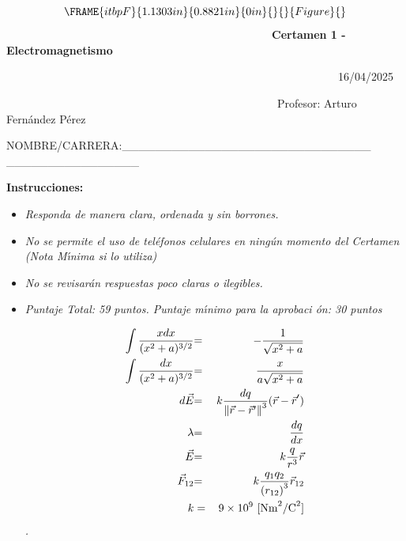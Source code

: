 \documentclass{article}
\begin{document}
\ 
\begin{equation*}
\FRAME{itbpF}{1.1303in}{0.8821in}{0in}{}{}{Figure}{\special{language
"Scientific Word";type "GRAPHIC";maintain-aspect-ratio TRUE;display
"USEDEF";valid_file "T";width 1.1303in;height 0.8821in;depth
0in;original-width 2.3531in;original-height 1.8291in;cropleft "0";croptop
"1";cropright "1";cropbottom "0";tempfilename
'SUT7UY00.bmp';tempfile-properties "XPR";}}
\end{equation*}%
\ \ \ \ \ \ \ \ \ \ \ \ \ \ \ \ \ \ \ \ \ \ \ \ \ \ \ \ \ \ \ \ \ \ \ \ \ \
\ \ \ \ \ \ \ \ \ \ \textbf{Certamen 1 - Electromagnetismo}

\ \ \ \ \ \ \ \ \ \ \ \ \ \ \ \ \ \ \ \ \ \ \ \ \ \ \ \ \ \ \ \ \ \ \ \ \ \
\ \ \ \ \ \ \ \ \ \ \ \ \ \ \ \ \ \ \ \ \ \ 16/04/2025

\noindent\ \ \ \ \ \ \ \ \ \ \ \ \ \ \ \ \ \ \ \ \ \ \ \ \ \ \ \ \ \ \ \ \ \
\ \ \ \ \ \ \ \ \ \ \ \ \ \ \ Profesor: Arturo Fern\'{a}ndez P\'{e}rez 
\hspace*{\stretch{0.7500}}

\bigskip

\bigskip
NOMBRE/CARRERA:\_\_\_\_\_\_\_\_\_\_\_\_\_\_\_\_\_\_\_\_\_\_\_\_\_\_\_\_\_\_%
\_\_\_\_\_\_\_\_\_\_\_\_\_\_\_\_

\textbf{Instrucciones: }

\begin{itemize}
\item \emph{Responda de manera clara, ordenada y sin borrones.}

\item \emph{No se permite el uso de tel\'{e}fonos celulares en ning\'{u}n
momento del Certamen (Nota M\'{\i}nima si lo utiliza)}

\item \emph{No se revisar\'{a}n respuestas poco claras o ilegibles. }

\item \emph{Puntaje Total: 59 puntos. Puntaje m\'{\i}nimo para la aprobaci%
\'{o}n: 30 puntos}

\begin{eqnarray*}
\int \frac{xdx}{(x^{2}+a)^{3/2}} &{\Large =}&{\Large -}\frac{1}{\sqrt{x^{2}+a%
}} \\
\int \frac{dx}{(x^{2}+a)^{3/2}} &{\Large =}&\frac{x}{a\sqrt{x^{2}+a}} \\
{\Large d\vec{E}} &{\Large =}&{\Large k}\frac{dq}{\left\Vert \vec{r}-\vec{r}%
^{\prime }\right\Vert ^{3}}{\Large (\vec{r}-\vec{r}}^{\prime }{\Large )} \\
{\Large \lambda } &{\Large =}&\frac{dq}{dx} \\
{\Large \vec{E}} &{\Large =}&{\Large k}\frac{q}{r^{3}}{\Large \vec{r}} \\
{\Large \vec{F}}_{12} &{\Large =}&{\Large k}\frac{q_{1}q_{2}}{\left(
r_{12}\right) ^{3}}{\Large \vec{r}}_{12} \\
k &=&9\times 10^{9}\text{ [Nm}^{2}\text{/C}^{2}\text{]}
\end{eqnarray*}%
\emph{.}\pagebreak 
\end{itemize}
\end{document}
